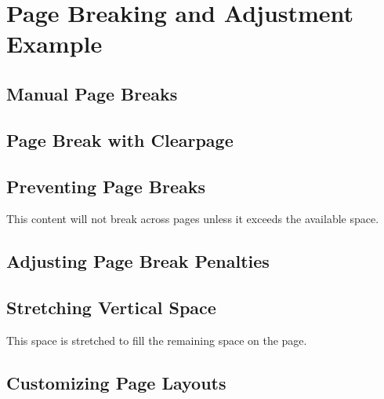 \documentclass{article}
\begin{document}
\section{Page Breaking and Adjustment Example}

\subsection{Manual Page Breaks}
\lipsum[1-3] %
\newpage %

\subsection{Page Break with Clearpage}
\lipsum[4-7] %
\clearpage %

\subsection{Preventing Page Breaks}
\lipsum[8-9] %
\begin{samepage}
    This content will not break across pages unless it exceeds the available space.
\end{samepage}
\lipsum[10-12] %

\subsection{Adjusting Page Break Penalties}
\lipsum[13-16] %
\lipsum[17-19] %

\subsection{Stretching Vertical Space}
\lipsum[20-22] %
This space is stretched to fill the remaining space on the page.
\clearpage %

\subsection{Customizing Page Layouts}
\lipsum[23-25] %
\enlargethispage{\baselineskip} %
\lipsum[26-28] %
\end{document}
